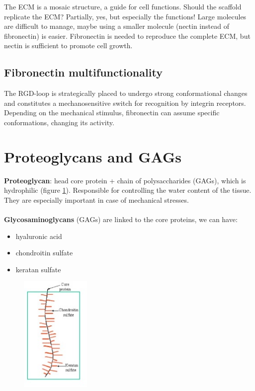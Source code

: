 \noindent
The ECM is a mosaic structure, a guide for cell functions.
Should the scaffold replicate the ECM? Partially, yes, but especially the functions! 
Large molecules are difficult to manage, maybe using a smaller molecule (nectin instead of fibronectin) is easier.
Fibronectin is needed to reproduce the complete ECM, but nectin is sufficient to promote cell growth.

\subsection{Fibronectin multifunctionality}
The RGD-loop is strategically placed to undergo strong conformational changes and constitutes a mechanosensitive switch for recognition by integrin receptors.
Depending on the mechanical stimulus, fibronectin can assume specific conformations, changing its activity.

\section{Proteoglycans and GAGs}

\textbf{Proteoglycan}: head core protein + chain of polysaccharides (GAGs), which is hydrophilic (figure \ref{fig:pgag}). 
Responsible for controlling the water content of the tissue.
They are especially important in case of mechanical stresses.
\\
\\
\noindent
\textbf{Glycosaminoglycans} (GAGs) are linked to the core proteins, we can have:
\begin{itemize}
\item hyaluronic acid
\item chondroitin sulfate
\item keratan sulfate
\end{itemize}

\begin{figure}[ht]
\centering
\includegraphics[width=0.3\textwidth]{pgag}
\caption{\label{fig:pgag}}
\end{figure}


